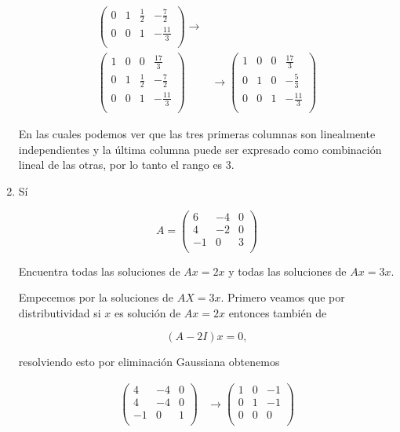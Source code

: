 \documentclass[letterpaper]{article}
\theoremstyle{definition}
\theoremstyle{lemathm}
\theoremstyle{lemademthm}
\begin{document}
\begin{enumerate}
\begin{align*}
\begin{pmatrix}
				0 & 1 & \frac{1}{2} & -\frac{7}{2}\\
				0 & 0 & 1 & -\frac{11}{3}\\
			\end{pmatrix}
			\rightarrow\\
			\begin{pmatrix}
				1 & 0 & 0 & \frac{17}{3}\\
				0 & 1 & \frac{1}{2} & -\frac{7}{2}\\
				0 & 0 & 1 & -\frac{11}{3}\\
			\end{pmatrix}
			&\rightarrow
			\begin{pmatrix}
				1 & 0 & 0 & \frac{17}{3}\\
				0 & 1 & 0 & -\frac{5}{3}\\
				0 & 0 & 1 & -\frac{11}{3}\\
			\end{pmatrix}
		\end{align*}

		En las cuales podemos ver que las tres primeras columnas son linealmente independientes y la última columna puede ser expresado como combinación lineal de las otras, por lo tanto el rango es 3.

		\newpage

		\item Sí
		
		\[A = \begin{pmatrix}
			6 & -4 & 0\\
			4 & -2 & 0\\
			-1 & 0 & 3\\
		\end{pmatrix}\]		
		
		Encuentra todas las soluciones de $Ax = 2x$ y todas las soluciones de $Ax = 3x$.

		Empecemos por la soluciones de $AX = 3x$. Primero veamos que por distributividad si $x$ es solución de $Ax = 2x$ entonces también de 

		\[(A-2I)x=0,\]

		resolviendo esto por eliminación Gaussiana obtenemos

		\begin{align*}
			\begin{pmatrix}
				4 & -4 & 0\\
				4 & -4 & 0\\
				-1 & 0 & 1\\
			\end{pmatrix}
			& \rightarrow
			\begin{pmatrix}
				1 & 0 & -1\\
				0 & 1 & -1\\
				0 & 0 & 0\\
			\end{pmatrix}
		\end{align*}


\end{enumerate}
\end{document}
